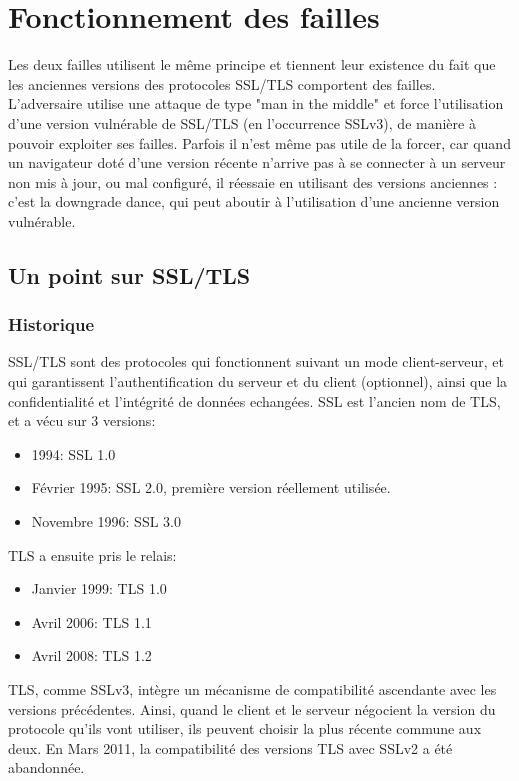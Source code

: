 \section{Fonctionnement des failles}


Les deux failles utilisent le m\^eme principe et tiennent leur existence du fait que les anciennes versions des protocoles SSL/TLS comportent des failles. L'adversaire utilise une attaque de type "man in the middle" et force l'utilisation d'une version vulnérable de SSL/TLS (en l'occurrence SSLv3), de manière à pouvoir exploiter ses failles. Parfois il n'est m\^eme pas utile de la forcer, car quand un navigateur doté d’une version récente n’arrive pas à se connecter à un serveur non mis à jour, ou mal configuré, il réessaie en utilisant des versions anciennes : c’est la downgrade dance, qui peut aboutir à l'utilisation d'une ancienne version vulnérable.

\subsection{Un point sur SSL/TLS}

\subsubsection{Historique}

SSL/TLS sont des protocoles qui fonctionnent suivant un mode client-serveur, et qui garantissent l'authentification du serveur et du client (optionnel), ainsi que la confidentialité et l'intégrité de données echangées. SSL est l'ancien nom de TLS, et a vécu sur 3 versions:
\begin{itemize}
\item 1994: SSL 1.0
\item Février 1995: SSL 2.0, première version réellement utilisée.
\item Novembre 1996: SSL 3.0 
\end{itemize}
TLS a ensuite pris le relais: 
\begin{itemize}
\item Janvier 1999: TLS 1.0
\item Avril 2006: TLS 1.1
\item Avril 2008: TLS 1.2
\end{itemize}
TLS, comme SSLv3, intègre un mécanisme de compatibilité ascendante avec les versions précédentes. Ainsi, quand le client et le serveur négocient la version du protocole qu'ils vont utiliser, ils peuvent choisir la plus récente commune aux deux. En Mars 2011, la compatibilité des versions TLS avec SSLv2 a été abandonnée. 

